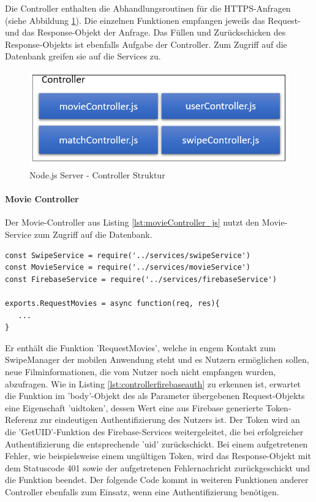 Die Controller enthalten die Abhandlungsroutinen für die HTTPS-Anfragen (siehe Abbildung \ref{ControllerStruktur}). Die einzelnen Funktionen empfangen jeweils das Request- und das Response-Objekt der Anfrage. Das Füllen und Zurückschicken des Response-Objekts ist ebenfalls Aufgabe der Controller. Zum Zugriff auf die Datenbank greifen sie auf die Services zu.\\



\begin{figure}[tbt]
\centering
\includegraphics[width=12cm]{images/controllerStruktur.PNG}
\caption{Node.js Server - Controller Struktur}
\label{ControllerStruktur}
\end{figure}

\paragraph{Movie Controller}

Der Movie-Controller  aus Listing \ref{lst:movieController_js} nutzt den Movie-Service zum Zugriff auf die Datenbank. \\

\begin{lstlisting}[caption=movieController.js Imports und Funktionen, label=lst:movieController_js]
const SwipeService = require('../services/swipeService')
const MovieService = require('../services/movieService')
const FirebaseService = require('../services/firebaseService')

exports.RequestMovies = async function(req, res){
   ...
}
\end{lstlisting}

\noindent
Er enthält die Funktion 'RequestMovies', welche in engem Kontakt zum SwipeManager der mobilen Anwendung steht und es Nutzern ermöglichen sollen, neue Filminformationen, die vom Nutzer noch nicht empfangen wurden, abzufragen.
\newline
Wie in Listing \ref{lst:controllerfirebaseauth} zu erkennen ist, erwartet die Funktion im 'body'-Objekt des als Parameter übergebenen Request-Objekts eine Eigenschaft 'uidtoken', dessen Wert eine aus Firebase generierte Token-Referenz zur eindeutigen Authentifizierung des Nutzers ist. Der Token wird an die 'GetUID'-Funktion des Firebase-Services weitergeleitet, die bei erfolgreicher Authentifizierung die entsprechende 'uid' zurückschickt. Bei einem aufgetretenen Fehler, wie beispielsweise einem ungültigen Token, wird das Response-Objekt mit dem Statuscode 401 sowie der aufgetretenen Fehlernachricht zurückgeschickt und die Funktion beendet. Der folgende Code kommt in weiteren Funktionen anderer Controller ebenfalls zum Einsatz, wenn eine Authentifizierung benötigen.

